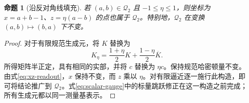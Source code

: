 \documentclass[UTF8,11pt,a4paper,fontset=fandol]{ctexart}
\newtheorem{proposition}[theorem]{命题}
\theoremstyle{definition}
\theoremstyle{remark}
\newcommand{\Q}{\mathcal Q_2}
\begin{document}
\begin{proposition}[沿反对角线填充]\label{prop:filling}
若 \((a,b)\in\Q\) 且 \(-1\leq\eta\leq1\)，则坐标为
\(x=a+b-1\)、\(z=\eta(a-b)\) 的点也属于 \(\Q\)。特别地，\(\Q\) 在变换 \((a,b)\mapsto(b,a)\) 下不变。
\end{proposition}
\begin{proof}
对于有限规范生成元，将 \(K\) 替换为
\begin{equation}\label{eq:drift-scaling}
 K_\eta=\frac{1+\eta}{2}K+\frac{1-\eta}{2}\overline K.
\end{equation}
所得矩阵半正定，具有相同的实部，并将 \(c\) 替换为 \(\eta c\)。保持规范哈密顿量不变。由式\eqref{eq:xz-readout}，\(x\) 保持不变，而 \(z\) 乘以 \(\eta\)。对有限逼近逐一施行此构造，即可将结论推广到 \(\Q\)。式\eqref{eq:scalar-gauge}中的标量跳跃修正在这一构造之前完成；所有生成元都以同一测量基表示。
\end{proof}
\end{document}
